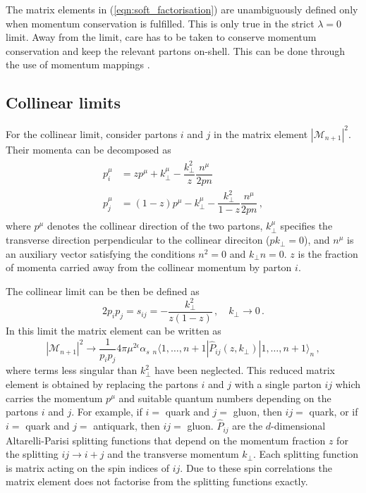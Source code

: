 \documentclass[main.tex]{subfiles}
\begin{document}
    The matrix elements in (\ref{eqn:soft_factorisation}) are
    unambiguously defined only when momentum conservation is
    fulfilled. This is only true in the strict $\lambda = 0$
    limit. Away from the limit, care has to be taken to conserve
    momentum conservation and keep the relevant partons on-shell.
    This can be done through the use of momentum mappings
    \cite{Catani:1996vz,Kosower:1997zr}.

\subsection{Collinear limits}\label{sec:me_collinear}
    For the collinear limit, consider partons $i$ and
    $j$ in the matrix element $|\mathcal{M}_{n+1}|^{2}$.
    Their momenta can be decomposed as
    \begin{align}\label{eqn:F_collinear_momenta}
        \begin{split}
        p_{i}^{\mu} &= z p^{\mu} + k_{\perp}^{\mu} - \dfrac{k_{\perp}^{2}}{z} \dfrac{n^{\mu}}{2 p n} \, \\
        p_{j}^{\mu} &= (1-z) p^{\mu} - k_{\perp}^{\mu} - \dfrac{k_{\perp}^{2}}{1-z}\dfrac{n^{\mu}}{2 p n} \, , 
        \end{split}
    \end{align}
    where $p^{\mu}$ denotes the collinear direction
    of the two partons, $k_{\perp}^{\mu}$ specifies
    the transverse direction perpendicular to the
    collinear direciton ($p k_{\perp} = 0$), and $n^{\mu}$ is an auxiliary
    vector satisfying the conditions $n^{2} = 0$ and $k_{\perp} n = 0$.
    $z$ is the fraction of momenta carried away from
    the collinear momentum by parton $i$.
    
    The collinear limit can be then be defined as
    \begin{equation}\label{eqn:F_collinear limit}
        2 p_{i} p_{j} = s_{ij} = - \dfrac{k_{\perp}^{2}}{z(1-z)} \, , \quad k_{\perp} \rightarrow 0 \, .
    \end{equation}
    In this limit the matrix element can be written as
    \begin{equation}\label{eqn:F_collinear_factorisation}
        |\mathcal{M}_{n+1}|^{2} \rightarrow \dfrac{1}{p_{i}p_{j}}4\pi \mu^{2\epsilon}\alpha_{s} \; {}_{n} \langle 1, \ldots, n+1 | \hat{P}_{ij}(z, k_{\perp}) | 1, \ldots, n+1 \rangle_{n} \, ,
    \end{equation}
    where terms less singular than $k_{\perp}^{2}$ have been neglected.
    This reduced matrix element is obtained by replacing the partons
    $i$ and $j$ with a single parton $ij$ which carries the
    momentum $p^{\mu}$ and suitable quantum numbers depending
    on the partons $i$ and $j$. For example, if $i =$ quark and $j=$ gluon,
    then $ij =$ quark, or if $i=$ quark and $j =$ antiquark, then $ij =$ gluon.
    $\hat{P}_{ij}$ are the $d$-dimensional Altarelli-Parisi splitting
    functions that depend on the momentum fraction $z$ for the splitting
    $ij \rightarrow i + j$ and the transverse momentum $k_{\perp}$.
    Each splitting function is matrix acting on the spin indices of $ij$.
    Due to these spin correlations the matrix
    element does not factorise from the splitting functions exactly.
\end{document}
